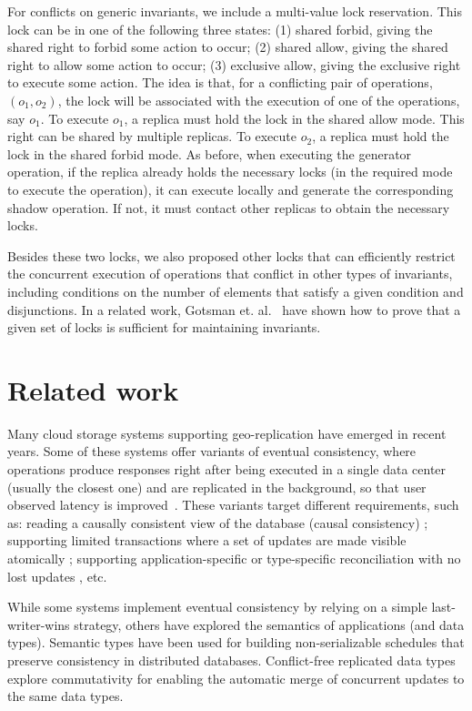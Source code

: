 \documentclass[11pt]{article}
\begin{document}
For conflicts on generic invariants, we include a multi-value lock
reservation. This lock can be in one of the following three states:
(1) shared forbid, giving the shared right to forbid some action to occur;
(2) shared allow, giving the shared right to allow some action to occur;
(3) exclusive allow, giving the exclusive right to execute some action.
The idea is that, for a conflicting pair of operations, $(o_1,o_2)$,
the lock will be associated with the execution of one of the operations,
say $o_1$.
To execute $o_1$, a replica must hold the lock in the shared allow mode.
This right can be shared by multiple replicas.
To execute $o_2$, a replica must hold the lock in the shared forbid mode.
As before, when executing the generator operation, if the replica already
holds the necessary locks (in the required mode to execute the operation),
it can execute locally and generate the corresponding shadow operation.
If not, it must contact other replicas to obtain the necessary locks.

Besides these two locks, we also proposed other locks that can
efficiently restrict the concurrent execution of operations that conflict
in other types of invariants, including conditions on the number of elements
that satisfy a given condition and disjunctions.
In a related work, Gotsman et. al.~\cite{GotsmanConsistencyReason}
have shown how to prove that a given set of locks is sufficient
for maintaining invariants.


\section{Related work}
\label{sec:rel}

Many cloud storage systems supporting geo-replication have emerged in recent years.
Some of these systems offer variants of eventual consistency, where operations produce
responses right after being executed in a single data center (usually the closest
one) and are replicated in the background, so that user observed latency is improved~\cite{dynamo,cops,eiger,chainreaction,cassandra}.
These variants target different requirements, such as: reading a causally consistent view of the database (causal consistency) \cite{cops,chainreaction,orbe,bolton}; supporting limited transactions where a set of updates are made visible atomically \cite{eiger,ramp}; supporting application-specific or type-specific reconciliation with no lost updates \cite{dynamo,cops,walter,riak}, etc.

While some systems implement eventual consistency by relying on a simple last-writer-wins
strategy, others have explored the semantics of applications (and data types).
Semantic types \cite{semanticDDB} have been used for building non-serializable
schedules that preserve consistency in distributed databases.
Conflict-free replicated data types~\cite{crdts} explore commutativity
for enabling the automatic merge of concurrent updates to the same data types.
\end{document}
